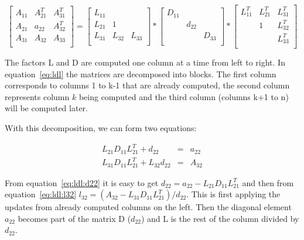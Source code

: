\begin{equation}
    \begin{bmatrix}
        A_{11} & A_{21}^T & A_{31}^T \\
        A_{21} & a_{22} & A_{32}^T \\
        A_{31} & A_{32} & A_{33} \\
    \end{bmatrix}
    =
    \begin{bmatrix}
        L_{11} & & \\
        L_{21} & 1 & \\
        L_{31} & L_{32} & L_{33} \\
    \end{bmatrix}
    *
    \begin{bmatrix}
        D_{11} & & \\
        & d_{22} & \\
        & & D_{33} \\
    \end{bmatrix}
    *
    \begin{bmatrix}
        L_{11}^T & L_{21}^T & L_{31}^T \\
        & 1 & L_{32}^T \\
        & & L_{33}^T \\
    \end{bmatrix}
    \label{eq:ldl}
\end{equation}

The factors L and D are computed one column at a time from left to right. In equation~\ref{eq:ldl} the matrices are decomposed into blocks. The first column corresponds to columns 1 to k-1 that are already computed, the second column represents column $k$ being computed and the third column (columns k+1 to n) will be computed later.

With this decomposition, we can form two equations:

\begin{eqnarray}
    L_{21}D_{11}L_{21}^T + d_{22} & = & a_{22} \label{eq:ldl:d22} \\
    L_{31}D_{11}L_{21}^T + L_{32}d_{22} & = & A_{32} \label{eq:ldl:l32}
\end{eqnarray}

From equation~\ref{eq:ldl:d22} it is easy to get $d_{22} = a_{22} - L_{21}D_{11}L_{21}^T$ and then from equation~\ref{eq:ldl:l32} $l_{32} = (A_{32} - L_{31}D_{11}L_{21}^T) / d_{22}$.
This is first applying the updates from already computed columns on the left. Then the diagonal element $a_{22}$ becomes part of the matrix D ($d_{22}$) and L is the rest of the column divided by $d_{22}$.
%

